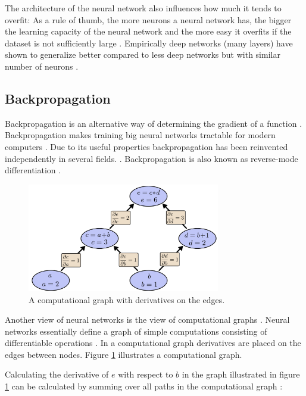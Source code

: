 \documentclass[draft,final,oneside]{vutinfth} %
\begin{document}
The architecture of the neural network also influences how much it tends to overfit: As a rule of thumb, the more neurons a neural network has, the bigger the learning capacity of the neural network and the more easy it overfits if the dataset is not sufficiently large \cite{Goodfellow-et-al-2016}. Empirically deep networks (many layers) have shown to generalize better compared to less deep networks but with similar number of neurons \cite{Goodfellow-et-al-2016}.

\subsection{Backpropagation} \label{backprop}

Backpropagation is an alternative way of determining the gradient of a function \cite{Goodfellow-et-al-2016}. Backpropagation makes training big neural networks tractable for modern computers \cite{bishop}. Due to its useful properties backpropagation has been reinvented independently in several fields. \cite{Griewank2012WhoIT}. Backpropagation is also known as reverse-mode differentiation \cite{colahbackprop}.

\begin{figure}[ht]
	\centering
  	\includegraphics[width=0.75\textwidth]{graphics/computationgraph.png}
	\caption{A computational graph with derivatives on the edges. \cite{colahbackprop}}
	\label{fig:computationgraph}
\end{figure}


Another view of neural networks is the view of computational graphs \cite{Goodfellow-et-al-2016}. Neural networks essentially define a graph of simple computations consisting of differentiable operations \cite{Goodfellow-et-al-2016}. In a computational graph derivatives are placed on the edges between nodes. Figure \ref{fig:computationgraph} illustrates a computational graph.

Calculating the derivative of $e$ with respect to $b$ in the graph illustrated in figure \ref{fig:computationgraph} can be calculated by summing over all paths in the computational graph \cite{colahbackprop}:
\end{document}
